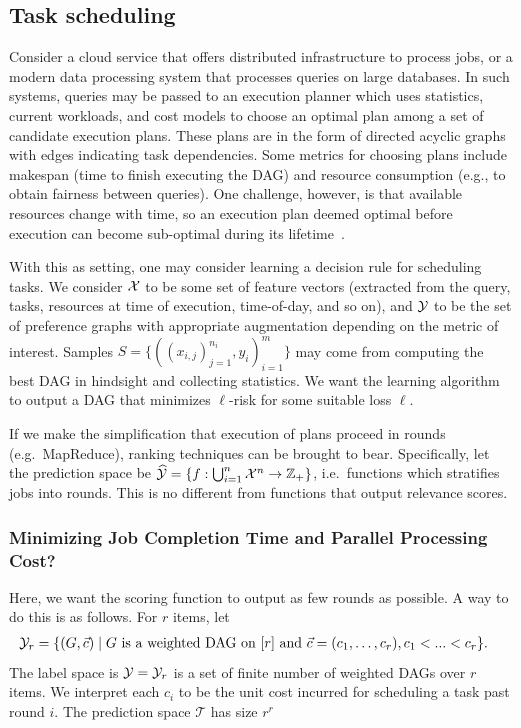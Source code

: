 
\subsection{Task scheduling}
Consider a cloud service that offers distributed infrastructure to process
jobs, or a modern data processing system that processes queries on large
databases.
In such systems, queries may be passed to an execution planner
which uses statistics, current workloads, and cost models to choose an optimal
plan among a set of candidate execution plans.
These plans are in the form of directed acyclic graphs with edges indicating
task dependencies.
Some metrics for choosing plans include makespan (time to finish executing
the DAG) and resource consumption (e.g., to obtain fairness between queries).
One challenge, however, is that available resources change with time,
so an execution plan deemed optimal before execution can become sub-optimal
during its lifetime~\cite{osdi-qoop}.

With this as setting, one may consider learning a decision rule for
scheduling tasks.
We consider ${\mathcal X}$ to be some set of feature vectors
(extracted from the query, tasks, resources at time of execution,
time-of-day, and so on), and ${\mathcal Y}$ to be the set of preference graphs with
appropriate augmentation depending on the metric of interest. Samples
$S = \{((x_{i,j})_{j=1}^{n_i}, y_i)_{i=1}^m\}$ may come from computing the best DAG
in hindsight and collecting statistics. We want the learning algorithm to
output a DAG that minimizes $\ell$-risk for some suitable loss $\ell$.

If we make the simplification that execution of plans proceed in rounds (e.g.\
MapReduce), ranking techniques can be brought to bear. Specifically,
let the prediction space be
$\widehat{\mathcal{Y}} = \{f: \bigcup_{i=1}^n {\mathcal X}^n \to \mathbb{Z}_+\}$,
i.e.\ functions which stratifies jobs into rounds. This is no different from
functions that output relevance scores.

\subsubsection{Minimizing Job Completion Time and Parallel Processing Cost?}
Here, we want the scoring function to output as few rounds as possible.
A way to do this is as follows. For $r$ items, let
\begin{align*}
  {\mathcal Y}_r &= \{ (G, \vec{c})
  \mid \text{$G$ is a weighted DAG on $[r]$ and $\vec{c} =( c_1, \ldots, c_r), c_1< ...< c_r$}
  \}.
\end{align*}
The label space is ${\mathcal Y} = {\mathcal Y}_r$ is a set of finite number of weighted DAGs over $r$ items. We interpret each $c_i$
to be the unit cost incurred for scheduling a task past round $i$.  The prediction space $\mathcal{T}$ has size $r^r$

